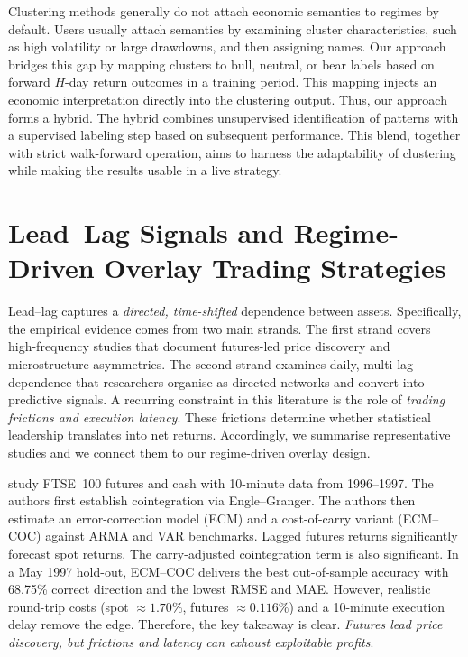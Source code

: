 Clustering methods generally do not attach economic semantics to regimes by default. Users usually attach semantics by examining cluster characteristics, such as high volatility or large drawdowns, and then assigning names. Our approach bridges this gap by mapping clusters to bull, neutral, or bear labels based on forward $H$-day return outcomes in a training period. This mapping injects an economic interpretation directly into the clustering output. Thus, our approach forms a hybrid. The hybrid combines unsupervised identification of patterns with a supervised labeling step based on subsequent performance. This blend, together with strict walk-forward operation, aims to harness the adaptability of clustering while making the results usable in a live strategy.

\section{Lead--Lag Signals and Regime-Driven Overlay Trading Strategies}

Lead--lag captures a \emph{directed, time-shifted} dependence between assets. Specifically, the empirical evidence comes from two main strands. The first strand covers high-frequency studies that document futures-led price discovery and microstructure asymmetries. The second strand examines daily, multi-lag dependence that researchers organise as directed networks and convert into predictive signals. A recurring constraint in this literature is the role of \emph{trading frictions and execution latency}. These frictions determine whether statistical leadership translates into net returns. Accordingly, we summarise representative studies and we connect them to our regime-driven overlay design.

\cite{BROOKS200131} study FTSE~100 futures and cash with 10-minute data from 1996--1997. The authors first establish cointegration via Engle--Granger. The authors then estimate an error-correction model (ECM) and a cost-of-carry variant (ECM--COC) against ARMA and VAR benchmarks. Lagged futures returns significantly forecast spot returns. The carry-adjusted cointegration term is also significant. In a May 1997 hold-out, ECM--COC delivers the best out-of-sample accuracy with 68.75\% correct direction and the lowest RMSE and MAE. However, realistic round-trip costs (spot $\approx 1.70\%$, futures $\approx 0.116\%$) and a 10-minute execution delay remove the edge. Therefore, the key takeaway is clear. \emph{Futures lead price discovery, but frictions and latency can exhaust exploitable profits}.

